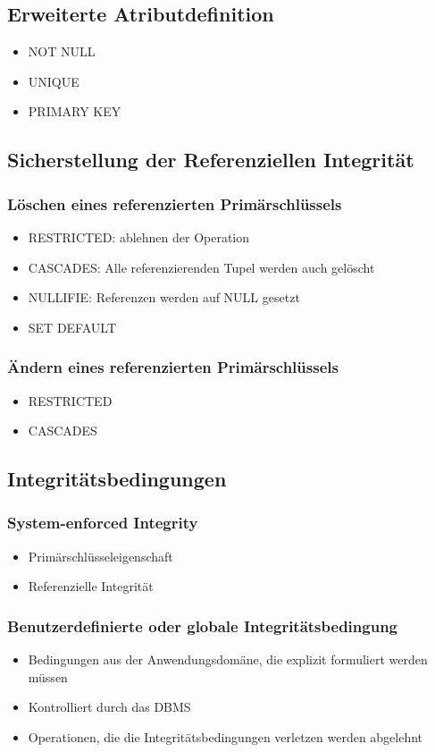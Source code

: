 \subsection{Erweiterte Atributdefinition}
\begin{itemize}
	\item NOT NULL
	\item UNIQUE
	\item PRIMARY KEY
\end{itemize}
\subsection{Sicherstellung der Referenziellen Integrität}
\subsubsection{Löschen eines referenzierten Primärschlüssels}
\begin{itemize}
	\item RESTRICTED: ablehnen der Operation
	\item CASCADES: Alle referenzierenden Tupel werden auch gelöscht
	\item NULLIFIE: Referenzen werden auf NULL gesetzt
	\item SET DEFAULT
\end{itemize}
\subsubsection{Ändern eines referenzierten Primärschlüssels}
\begin{itemize}
	\item RESTRICTED
	\item CASCADES
\end{itemize}

\subsection{Integritätsbedingungen}
\subsubsection{\glqq{}System-enforced Integrity\grqq{}}
\begin{itemize}
	\item Primärschlüsseleigenschaft
	\item Referenzielle Integrität
\end{itemize}
\subsubsection{Benutzerdefinierte oder \glqq{}globale\grqq{} Integritätsbedingung}
\begin{itemize}
	\item Bedingungen aus der Anwendungsdomäne, die explizit formuliert werden müssen
	\item Kontrolliert durch das DBMS
	\item Operationen, die die Integritätsbedingungen verletzen werden abgelehnt
\end{itemize}

